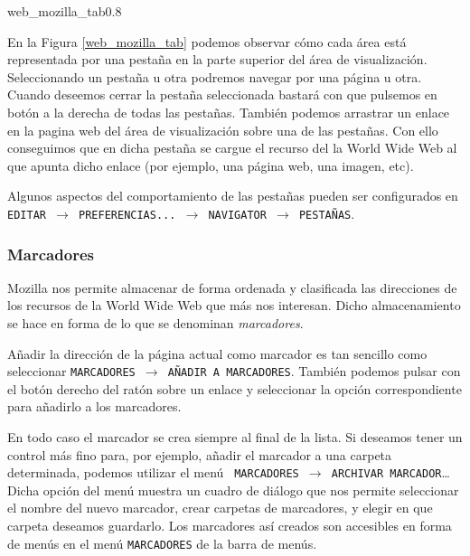 \begin{figura}{web_mozilla_tab}{0.8}
\caption{Navegación con pestañas en Mozilla}
\label{web_mozilla_tab}
\end{figura}

En  la Figura  \ref{web_mozilla_tab} podemos  observar cómo  cada área
está representada  por una pestaña  en la  parte superior del  área de
visualización. Seleccionando  un pestaña  u otra podremos  navegar por
una  página u  otra. Cuando  deseemos cerrar  la pestaña  seleccionada
bastará con que pulsemos en botón  a la derecha de todas las pestañas.
También  podemos arrastrar  un enlace  en la  pagina web  del área  de
visualización sobre una  de las pestañas. Con ello  conseguimos que en
dicha pestaña se cargue el recurso del la World Wide Web al que apunta
dicho enlace (por ejemplo, una página web, una imagen, etc).

Algunos   aspectos  del   comportamiento   de   las  pestañas   pueden
ser   configurados  en   {\tt  EDITAR   $\rightarrow$  PREFERENCIAS...
$\rightarrow$ NAVIGATOR $\rightarrow$ PESTAÑAS}.

\subsubsection{Marcadores}

{\sf Mozilla}  nos permite almacenar  de forma ordenada  y clasificada
las  direcciones de  los recursos  de la  World Wide  Web que  más nos
interesan.  Dicho  almacenamiento  se  hace  en forma  de  lo  que  se
denominan {\em marcadores}.

Añadir la dirección de la página  actual como marcador es tan sencillo
como seleccionar  {\tt MARCADORES $\rightarrow$ AÑADIR  A MARCADORES}.
También  podemos  pulsar con  el  botón  derecho  del ratón  sobre  un
enlace y  seleccionar la  opción correspondiente  para añadirlo  a los
marcadores.

En todo  caso el  marcador se crea  siempre al final  de la  lista. Si
deseamos  tener un  control  más  fino para,  por  ejemplo, añadir  el
marcador  a una  carpeta determinada,  podemos utilizar  el menú  {\tt
MARCADORES $\rightarrow$ ARCHIVAR MARCADOR}\dots Dicha opción del menú
muestra un cuadro de diálogo que nos permite seleccionar el nombre del
nuevo marcador, crear carpetas de  marcadores, y elegir en que carpeta
deseamos guardarlo. Los marcadores así creados son accesibles en forma
de menús en el menú {\tt MARCADORES} de la barra de menús.

